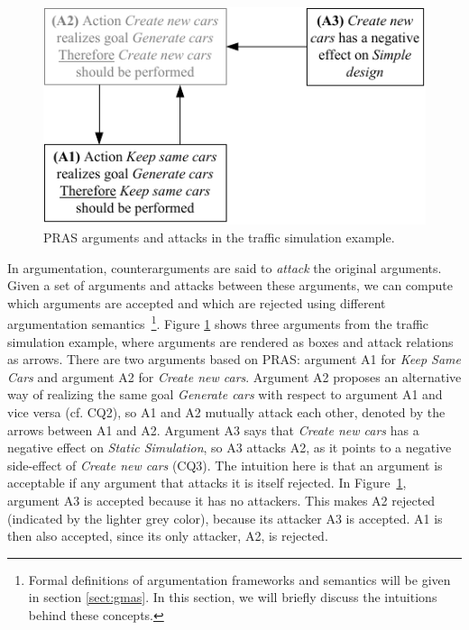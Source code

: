 \begin{figure}[t]
\centering
\includegraphics[]{img/fig_AF1.pdf}
\caption{PRAS arguments and attacks in the traffic simulation example.}
\label{fig:pras:example}
\end{figure}

In argumentation, counterarguments are said to \emph{attack} the original arguments. Given a set of arguments and attacks between these arguments, we can compute which arguments are accepted and which are rejected using different argumentation semantics~\cite{Dung1995}\footnote{Formal definitions of argumentation frameworks and semantics will be given in section \ref{sect:gmas}. In this section, we will briefly discuss the intuitions behind these concepts.}. Figure \ref{fig:pras:example} shows three arguments from the traffic simulation example, where arguments are rendered as boxes and attack relations as arrows. There are two arguments based on PRAS: argument A1 for \emph{Keep Same Cars} and argument A2 for \emph{Create new cars}. Argument A2 proposes an alternative way of realizing the same goal \emph{Generate cars} with respect to argument A1 and vice versa (cf. CQ2), so A1 and A2 mutually attack each other, denoted by the arrows between A1 and A2. Argument A3 says that \emph{Create new cars} has a negative effect on \emph{Static Simulation}, so A3 attacks A2, as it points to a negative side-effect of \emph{Create new cars} (CQ3). The intuition here is that an argument is acceptable if any argument that attacks it is itself rejected. In Figure~\ref{fig:pras:example}, argument A3 is accepted because it has no attackers. This makes A2 rejected (indicated by the lighter grey color), because its attacker A3 is accepted. A1 is then also accepted, since its only attacker, A2, is rejected. 


